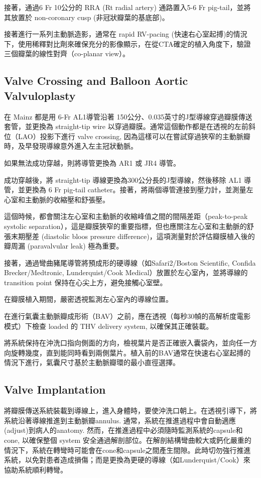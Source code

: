 \documentclass[nols]{tufte-book}
\begin{document}
接著，通過6 Fr 10公分的 RRA (Rt radial artery) 通路置入5-6 Fr pig-tail，並將其放置於 non-coronary cusp (非冠狀瓣葉的基底部)。

接著進行一系列主動脈造影，通常在 rapid RV-pacing (快速右心室起搏)的情況下，使用稀釋對比劑來確保充分的影像顯示，在從CTA確定的植入角度下，驗證三個瓣葉的線性對齊（co-planar view）。

\subsection{Valve Crossing and Balloon Aortic Valvuloplasty}
在 Mainz 都是用 6-Fr AL1導管沿著 150公分、0.035英寸的J型導線穿過瓣膜傳送套管，並更換為 straight-tip wire 以穿過瓣膜。通常這個動作都是在透視的左前斜位（LAO）投影下進行 valve crossing, 因為這樣可以在嘗試穿過狹窄的主動脈瓣時，及早發現導線意外進入左主冠狀動脈。

如果無法成功穿越，則將導管更換為 AR1 或 JR4 導管。

成功穿越後，將 straight-tip 導線更換為300公分長的J型導線，然後移除 AL1 導管，並更換為 6 Fr pig-tail catheter。接著，將兩個導管連接到壓力計，並測量左心室和主動脈的收縮壓和舒張壓。

這個時候，都會關注左心室和主動脈的收縮峰值之間的間隔差距（peak-to-peak systolic separation），這是瓣膜狹窄的重要指標，但也應關注左心室和主動脈的舒張末期壓差 (diastolic bloos pressure difference)，這項測量對於評估瓣膜植入後的瓣周漏 (paravalvular leak) 極為重要。

接著，通過彎曲豬尾導管將預成形的硬導線（如Safari2/Boston Scientific, Confida Brecker/Medtronic, Lunderquist/Cook Medical）放置於左心室內，並將導線的 transition point 保持在心尖上方，避免接觸心室壁。

在瓣膜植入期間，嚴密透視監測左心室內的導線位置。

在進行氣囊主動脈瓣成形術（BAV）之前，應在透視（每秒30幀的高解析度電影模式）下檢查 loaded 的 THV delivery system, 以確保其正確裝載。

將系統保持在沖洗口指向側面的方向，檢視葉片是否正確嵌入囊袋內，並向任一方向旋轉幾度，直到能同時看到兩側葉片。植入前的BAV通常在快速右心室起搏的情況下進行，氣囊尺寸基於主動脈瓣環的最小直徑選擇。

\subsection{Valve Implantation}
將瓣膜傳送系統裝載到導線上，進入身體時，要使沖洗口朝上。在透視引導下，將系統沿著導線推進到主動脈瓣annulus. 通常，系統在推進過程中會自動適應 (adjust)到病人的anatomy. 然而，在推進過程中必須隨時監測系統的capsule和 cone, 以確保整個 system 安全通過解剖部位。在解剖結構彎曲較大或鈣化嚴重的情況下，系統在轉彎時可能會在cone和capsule之間產生間隙。此時切勿強行推進系統，以免對患者造成損傷；而是更換為更硬的導線（如Lunderquist/Cook）來協助系統順利轉彎。
\end{document}

